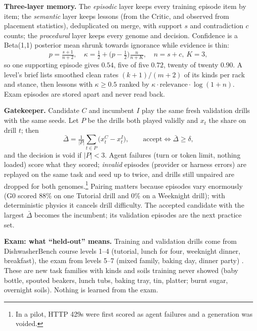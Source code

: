 \documentclass[9pt,twocolumn,letterpaper]{extarticle}
\begin{document}
\textbf{Three-layer memory.} The \emph{episodic} layer keeps every training episode item by item;
the \emph{semantic} layer keeps lessons (from the Critic, and observed from placement statistics),
deduplicated on merge, with support $s$ and contradiction $c$ counts; the \emph{procedural} layer
keeps every genome and decision. Confidence is a Beta(1,1) posterior mean shrunk towards ignorance
while evidence is thin:
\begin{equation}
p=\tfrac{s+1}{n+2},\quad \kappa=\tfrac12+\big(p-\tfrac12\big)\tfrac{n}{n+K},\quad n=s+c,\ K=3,
\label{eq:conf}
\end{equation}
so one supporting episode gives $0.54$, five of five $0.72$, twenty of twenty $0.90$. A level's
brief lists smoothed clean rates $(k+1)/(m+2)$ of its kinds per rack and stance, then lessons with
$\kappa\ge0.5$ ranked by $\kappa\cdot\text{relevance}\cdot\log(1+n)$. Exam episodes are stored
apart and never read back.

\textbf{Gatekeeper.} Candidate $C$ and incumbent $I$ play the same fresh validation drills with the
same seeds. Let $P$ be the drills both played validly and $x_t$ the share on drill $t$; then
\begin{equation}
\bar\Delta=\tfrac{1}{|P|}\textstyle\sum_{t\in P}\big(x_t^{C}-x_t^{I}\big),\qquad
\text{accept}\iff \bar\Delta\ge\delta,
\label{eq:gate}
\end{equation}
and the decision is void if $|P|<3$. Agent failures (turn or token limit, nothing loaded) score what
they scored; \emph{invalid} episodes (provider or harness errors) are replayed on the same task and
seed up to twice, and drills still unpaired are dropped for both genomes.\footnote{In a pilot, HTTP 429s were first scored as agent failures and a generation was voided.} Pairing matters because episodes vary enormously (G0 scored 88\% on one Tutorial drill and 0\%
on a Weeknight drill); with deterministic physics it cancels drill difficulty. The accepted
candidate with the largest $\bar\Delta$ becomes the incumbent; its validation episodes are the next
practice set.

\textbf{Exam: what ``held-out'' means.} Training and validation drills come from DishwasherBench
course levels 1--4 (tutorial, lunch for four, weeknight dinner, breakfast), the exam from levels
5--7 (mixed family, baking day, dinner party) \citep{composo2026dishwasherbench}. These are new task
families with kinds and soils training never showed (baby bottle, spouted beakers, lunch tubs,
baking tray, tin, platter; burnt sugar, overnight soils). Nothing is learned from the exam.
\end{document}
